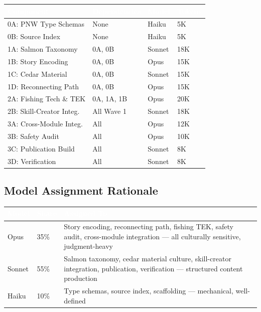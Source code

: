 \documentclass[11pt,letterpaper]{article}
\newcommand{\tableheader}[1]{\textbf{\sffamily\textcolor{white}{#1}}}
\begin{document}
\begin{center}
\begin{tabularx}{\textwidth}{L{3.5cm}L{2cm}C{1.5cm}C{1.5cm}}
\toprule
{}
\tableheader{Component} & \tableheader{Dependencies} & \tableheader{Model} & \tableheader{Tokens} \\
\midrule
0A: PNW Type Schemas & None & Haiku & 5K \\
0B: Source Index & None & Haiku & 5K \\
1A: Salmon Taxonomy & 0A, 0B & Sonnet & 18K \\
1B: Story Encoding & 0A, 0B & Opus & 15K \\
1C: Cedar Material & 0A, 0B & Sonnet & 15K \\
1D: Reconnecting Path & 0A, 0B & Opus & 15K \\
2A: Fishing Tech \& TEK & 0A, 1A, 1B & Opus & 20K \\
2B: Skill-Creator Integ. & All Wave 1 & Sonnet & 18K \\
3A: Cross-Module Integ. & All & Opus & 12K \\
3B: Safety Audit & All & Opus & 10K \\
3C: Publication Build & All & Sonnet & 8K \\
3D: Verification & All & Sonnet & 8K \\
\bottomrule
\end{tabularx}
\end{center}

\subsection{Model Assignment Rationale}

\begin{center}
\begin{tabularx}{\textwidth}{C{1.5cm}C{1.5cm}X}
\toprule
{}
\tableheader{Model} & \tableheader{Share} & \tableheader{Assigned To} \\
\midrule
Opus & 35\% & Story encoding, reconnecting path, fishing TEK, safety audit, cross-module integration --- all culturally sensitive, judgment-heavy \\
Sonnet & 55\% & Salmon taxonomy, cedar material culture, skill-creator integration, publication, verification --- structured content production \\
Haiku & 10\% & Type schemas, source index, scaffolding --- mechanical, well-defined \\
\bottomrule
\end{tabularx}
\end{center}
\end{document}
